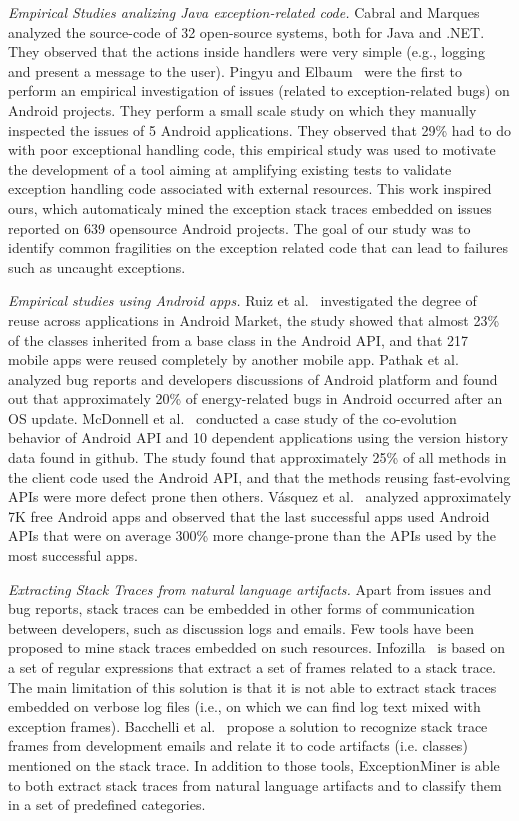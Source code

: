\documentclass[conference]{IEEEtran}
\begin{document}
\textit{Empirical Studies analizing Java exception-related code.} 
Cabral and Marques~\cite{cabral2007exception} analyzed the
source-code of 32 open-source systems, both for Java and .NET. They
observed that the actions inside handlers were very simple (e.g., logging and present a
message to the user). Pingyu and Elbaum~\cite{Zhang12} were the first to perform
an empirical investigation of issues (related to exception-related bugs) on Android projects.  
They perform a small scale study on which they manually inspected the issues of 
5 Android applications. They observed that 29\% had to do with poor
exceptional handling code, this empirical study was used to motivate the development of a tool
aiming at amplifying existing tests to validate exception 
handling code associated with external resources. This work inspired ours,
 which automaticaly mined the exception stack traces embedded on issues 
reported on 639 opensource Android projects. The goal of our study was
to identify common fragilities on the exception related code that can lead to 
failures such as uncaught exceptions. 

\textit{Empirical studies using Android apps.} Ruiz et al.~\cite{Ruiz12}
investigated the degree of reuse across applications in Android Market, the
study showed that almost 23\% of the classes inherited from a base class in the
Android API, and that 217 mobile apps were reused completely by another mobile
app. Pathak et al.~\cite{Patha11} analyzed bug reports and developers
discussions of Android platform and found out that approximately 20\% of
energy-related bugs in Android occurred after an OS update. McDonnell et
al.~\cite{McDon13} conducted a case study of the co-evolution behavior of
Android API and 10 dependent applications using the version history data found
in github. The study found that approximately 25\% of all methods in the client
code used the Android API, and that the methods reusing fast-evolving APIs were
more defect prone then others. Vásquez et al.~\cite{Linar13} analyzed
approximately 7K free Android apps and observed that the last successful apps
used Android APIs that were on average 300\% more change-prone than the APIs
used by the most successful apps. 

\textit{Extracting Stack Traces from natural language artifacts.} 
Apart from issues and bug reports, stack traces can be embedded in other forms of
communication between developers, such as discussion logs and emails.
Few tools have been proposed to mine stack traces embedded on such resources.
 Infozilla~\cite{bettenburg2008extracting} is based on a set of regular expressions that extract a set of frames
related to a stack trace. The main limitation of this solution is that it is not
able to extract stack traces embedded on verbose log files (i.e., on which we
can find log text mixed with exception frames). Bacchelli
et al.~\cite{bacchelli2012content} propose a solution to recognize stack trace frames
from development emails and relate it to code artifacts (i.e. classes) mentioned
on the stack trace. In addition to those tools, ExceptionMiner is able to 
both extract stack traces from natural language artifacts and to 
classify them in a set of predefined categories.
\end{document}
